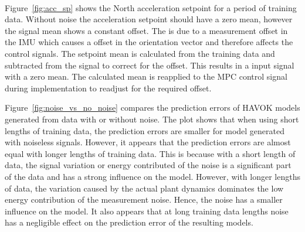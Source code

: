         \paragraph{}
        Figure~\ref{fig:acc_sp} shows the North acceleration setpoint for a period of training data.
        Without noise the acceleration setpoint should have a zero mean, 
        however the signal mean shows a constant offset.
        The is due to a measurement offset in the IMU which causes a offset in the orientation vector 
        and therefore affects the control signals.
        The setpoint mean is calculated from the training data and subtracted from the signal to correct for the offset.
        This results in a input signal with a zero mean.
        The calculated mean is reapplied to the MPC control signal during implementation
        to readjust for the required offset.

        
        
        

        Figure~\ref{fig:noise_vs_no_noise} compares the prediction errors of HAVOK models generated from data with or without noise.
        The plot shows that when using short lengths of training data, 
        the prediction errors are smaller for model generated with noiseless signals.
        However, it appears that the prediction errors are almost equal with longer lengths of training data.
        This is because with a short length of data, the signal variation or energy contributed of the noise is a significant part of the data
        and has a strong influence on the model.
        However, with longer lengths of data, the variation caused by the actual plant dynamics 
        dominates the low energy contribution of the measurement noise. 
        Hence, the noise has a smaller influence on the model.        
        It also appears that at long training data lengths noise has a negligible effect on the prediction error of the resulting models.

